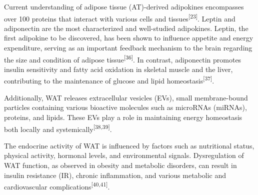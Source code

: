 \documentclass[
  11pt,
  letterpaper,
]{book}
\begin{document}
Current understanding of adipose tissue (AT)-derived adipokines
encompasses over 100 proteins that interact with various cells and
tissues\textsuperscript{{[}23{]}}. Leptin and adiponectin are the most
characterized and well-studied adipokines. Leptin, the first adipokine
to be discovered, has been shown to influence appetite and energy
expenditure, serving as an important feedback mechanism to the brain
regarding the size and condition of adipose
tissue\textsuperscript{{[}36{]}}. In contrast, adiponectin promotes
insulin sensitivity and fatty acid oxidation in skeletal muscle and the
liver, contributing to the maintenance of glucose and lipid
homeostasis\textsuperscript{{[}37{]}}.

Additionally, WAT releases extracellular vesicles (EVs), small
membrane-bound particles containing various bioactive molecules such as
microRNAs (miRNAs), proteins, and lipids. These EVs play a role in
maintaining energy homeostasis both locally and
systemically\textsuperscript{{[}38,39{]}}.

The endocrine activity of WAT is influenced by factors such as
nutritional status, physical activity, hormonal levels, and
environmental signals. Dysregulation of WAT function, as observed in
obesity and metabolic disorders, can result in insulin resistance (IR),
chronic inflammation, and various metabolic and cardiovascular
complications\textsuperscript{{[}40,41{]}}.
\end{document}
